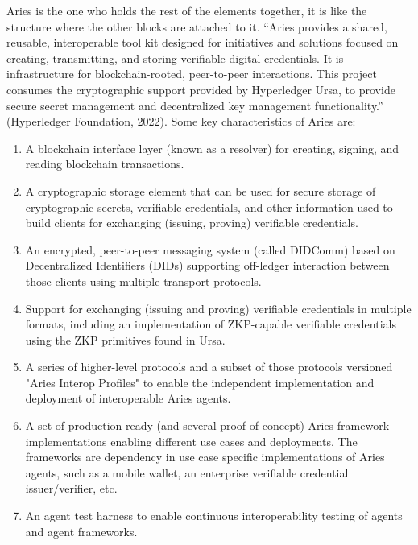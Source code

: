 Aries is the one who holds the rest of the elements together, it is like the structure where the other blocks are attached to it. “Aries provides a shared, reusable, interoperable tool kit designed for initiatives and solutions focused on creating, transmitting, and storing verifiable digital credentials. It is infrastructure for blockchain-rooted, peer-to-peer interactions. This project consumes the cryptographic support provided by Hyperledger Ursa, to provide secure secret management and decentralized key management functionality.” (Hyperledger Foundation, 2022). Some key characteristics of Aries are:

\begin{enumerate}
    \item A blockchain interface layer (known as a resolver) for creating, signing, and reading blockchain transactions.
    \item A cryptographic storage element that can be used for secure storage of cryptographic secrets, verifiable credentials, and other information used to build clients for exchanging (issuing, proving) verifiable credentials.
    \item An encrypted, peer-to-peer messaging system (called DIDComm) based on Decentralized Identifiers (DIDs) supporting off-ledger interaction between those clients using multiple transport protocols.
    \item Support for exchanging (issuing and proving) verifiable credentials in multiple formats, including an implementation of ZKP-capable verifiable credentials using the ZKP primitives found in Ursa.
    \item A series of higher-level protocols and a subset of those protocols versioned "Aries Interop Profiles" to enable the independent implementation and deployment of interoperable Aries agents.
    \item A set of production-ready (and several proof of concept) Aries framework implementations enabling different use cases and deployments. The frameworks are dependency in use case specific implementations of Aries agents, such as a mobile wallet, an enterprise verifiable credential issuer/verifier, etc.
    \item An agent test harness to enable continuous interoperability testing of agents and agent frameworks.
\end{enumerate}
